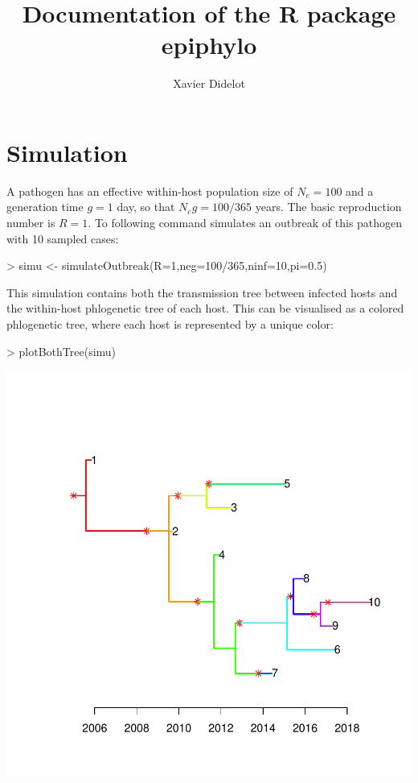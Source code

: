 \documentclass[a4paper]{article}
\title{Documentation of the R package epiphylo}
\author{Xavier Didelot}
\begin{document}


\maketitle


\section{Simulation}

A pathogen has an effective within-host population size of $N_e=100$ and a generation time $g=1$ day, so that $N_e g=100/365$ years. The basic reproduction number is $R=1$. To following command simulates an outbreak of this pathogen with 10 sampled cases: 
\begin{Schunk}
\begin{Sinput}
> simu <- simulateOutbreak(R=1,neg=100/365,ninf=10,pi=0.5)
\end{Sinput}
\end{Schunk}

This simulation contains both the transmission tree between infected hosts and the within-host phlogenetic tree of each host. This can be visualised as a colored phlogenetic tree, where each host is represented by a unique color:

\begin{center}
\begin{Schunk}
\begin{Sinput}
> plotBothTree(simu)
\end{Sinput}
\end{Schunk}
\includegraphics{epiphylo-003}
\end{center}
\end{document}
